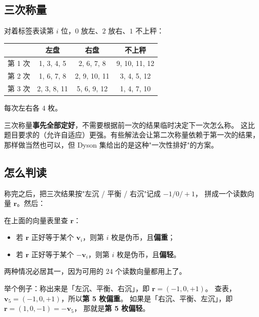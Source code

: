 \documentclass[UTF8,11pt,fontset=macnew]{ctexart}
\newcommand{\vv}{\mathbf{v}}
\newcommand{\rr}{\mathbf{r}}
\begin{document}
\subsection{三次称量}

对着标签表读第 $i$ 位，$0$ 放左、$2$ 放右、$1$ 不上秤：

\begin{center}
\begin{tabular}{c c c c}
\toprule
& 左盘 & 右盘 & 不上秤 \\
\midrule
第 1 次 & 1, 3, 4, 5   & 2, 6, 7, 8    & 9, 10, 11, 12 \\
第 2 次 & 1, 6, 7, 8   & 2, 9, 10, 11  & 3, 4, 5, 12 \\
第 3 次 & 2, 3, 8, 11  & 5, 6, 9, 12   & 1, 4, 7, 10 \\
\bottomrule
\end{tabular}
\end{center}

每次左右各 $4$ 枚。

\begin{warnbox}
三次称量\textbf{事先全部定好}，不需要根据前一次的结果临时决定下一次怎么称。
这比题目要求的（允许自适应）更强。有些解法会让第二次称量依赖于第一次的结果，
那样做当然也可以，但 Dyson 集给出的是这种"一次性排好"的方案。
\end{warnbox}

\subsection{怎么判读}

称完之后，把三次结果按"左沉 / 平衡 / 右沉"记成 $-1/0/+1$，
拼成一个读数向量 $\rr$。然后：

\begin{keybox}[判读规则]
在上面的向量表里查 $\rr$：
\begin{itemize}
  \item 若 $\rr$ 正好等于某个 $\vv_i$，则第 $i$ 枚是伪币，且\textbf{偏重}；
  \item 若 $\rr$ 正好等于某个 $-\vv_i$，则第 $i$ 枚是伪币，且\textbf{偏轻}。
\end{itemize}
两种情况必居其一，因为可用的 $24$ 个读数向量都用上了。
\end{keybox}

举个例子：称出来是「左沉、平衡、右沉」，即 $\rr=(-1,0,+1)$。
查表，$\vv_5=(-1,0,+1)$，所以\textbf{第 5 枚偏重}。
如果是「右沉、平衡、左沉」，即 $\rr=(1,0,-1)=-\vv_5$，
那就是\textbf{第 5 枚偏轻}。
\end{document}
